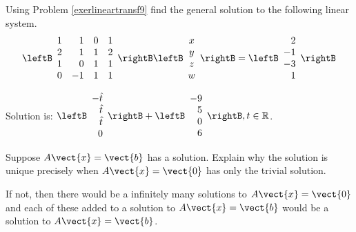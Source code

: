 \begin{enumialphparenastyle}
\begin{ex} Using Problem \ref{exerlineartransf9} find the general solution to the following
linear system.
\begin{equation*}
\leftB
\begin{array}{rrrr}
1 & 1 & 0 & 1 \\
2 & 1 & 1 & 2 \\
1 & 0 & 1 & 1 \\
0 & -1 & 1 & 1
\end{array}
\rightB \leftB
\begin{array}{c}
x \\
y \\
z \\
w
\end{array}
\rightB =\leftB
\begin{array}{r}
2 \\
-1 \\
-3 \\
1
\end{array}
\rightB 
\end{equation*}
\begin{sol}
Solution is: $\leftB
\begin{array}{r}
-\hat{t} \\
\hat{t} \\
\hat{t} \\
0
\end{array}
\rightB +\leftB
\begin{array}{r}
-9 \\
5 \\
0 \\
6
\end{array}
\rightB ,t\in \mathbb{R}$.
\end{sol}
\end{ex}


\begin{ex} Suppose $A\vect{x}=\vect{b}$ has a solution. Explain why the solution is
unique precisely when $A\vect{x}=\vect{0}$ has only the trivial solution.
\vspace{1mm}
\begin{sol}
If not, then there would be a infinitely many solutions to $A\vect{x}=\vect{0}$
and each of these added to a solution to $A\vect{x}=\vect{b}$ would be a solution
to $A\vect{x}=\vect{b}$.
\end{sol}
\end{ex}

\end{enumialphparenastyle}